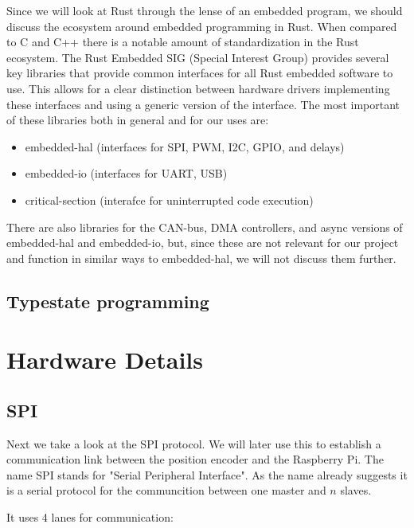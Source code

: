 Since we will look at Rust through the lense of an embedded program, we should discuss the ecosystem around embedded programming in Rust.
When compared to C and C++ there is a notable amount of standardization in the Rust ecosystem.
The Rust Embedded SIG (Special Interest Group) provides several key libraries that provide common interfaces for all Rust embedded software to use.
This allows for a clear distinction between hardware drivers implementing these interfaces and using a generic version of the interface.
The most important of these libraries both in general and for our uses are:
\begin{itemize}
    \item embedded-hal (interfaces for SPI, PWM, I2C, GPIO, and delays)
    \item embedded-io (interfaces for UART, USB)
    \item critical-section (interafce for uninterrupted code execution)
\end{itemize}

There are also libraries for the CAN-bus, DMA controllers, and async versions of embedded-hal and embedded-io,
but, since these are not relevant for our project and function in similar ways to embedded-hal,
we will not discuss them further.



\subsection{Typestate programming}
\label{sec:background:rust:typestate}

\section{Hardware Details}
\label{sec:background:hardware}

\subsection{SPI}
\label{sec:background:hardware:spi}

Next we take a look at the SPI protocol.
We will later use this to establish a communication link between the position encoder and the Raspberry Pi.
The name SPI stands for "Serial Peripheral Interface".
As the name already suggests it is a serial protocol for the communcition between one master and $n$ slaves.

It uses 4 lanes for communication\cite[p. 220]{SensornetzwerkeInTheorieUndPraxis}:


